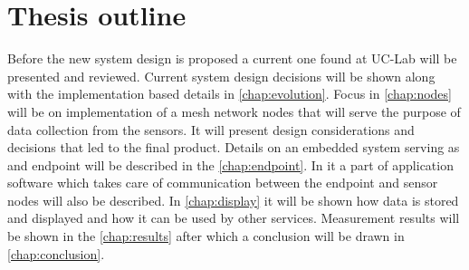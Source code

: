 \section{Thesis outline}

Before the new system design is proposed a current one found at \ac{UC-Lab} will be presented and reviewed. Current system design decisions will be shown along with the implementation based details in \autoref{chap:evolution}. Focus in \autoref{chap:nodes} will be on implementation of a mesh network nodes that will serve the purpose of data collection from the sensors. It will present design considerations and decisions that led to the final product. Details on an embedded system serving as and endpoint will be described in the \autoref{chap:endpoint}. In it a part of application software which takes care of communication between the endpoint and sensor nodes will also be described. In \autoref{chap:display} it will be shown how data is stored and displayed and how it can be used by other services. Measurement results will be shown in the \autoref{chap:results} after which a conclusion will be drawn in \autoref{chap:conclusion}.